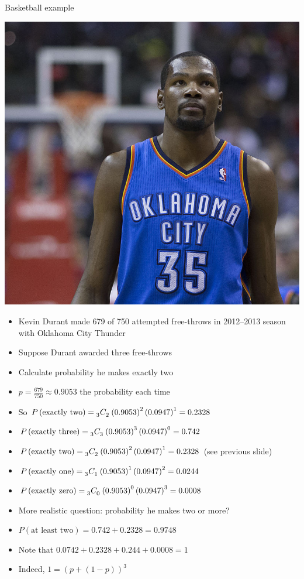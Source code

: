 \documentclass[handout,xcolor=dvipsnames]{beamer}
\theoremstyle{definition}
\newcommand\ncr[2]{\tensor[_{#1}]C{_{#2}}}
\begin{document}
\begin{frame}{Basketball example}
\begin{multicols}{2}
\includegraphics[scale=.75]{KevinDurant}
\begin{itemize}
\item Kevin Durant made 679 of 750 attempted free-throws
in 2012--2013 season with Oklahoma City Thunder
\item Suppose Durant awarded three free-throws
\item Calculate probability he makes exactly two
\item $p=\frac{679}{750}\approx 0.9053$ the probability
each time
\item So $P\left(\text{exactly two}\right)
=\ncr{3}{2}\left(0.9053\right)^2\left(0.0947\right)^1=0.2328$
\end{itemize}
\end{multicols}
\end{frame}

\begin{frame}
\begin{itemize}
\item $P\left(\text{exactly three}\right)
=\ncr{3}{3}\left(0.9053\right)^3\left(0.0947\right)^0=0.742$
\item $P\left(\text{exactly two}\right)
=\ncr{3}{2}\left(0.9053\right)^2\left(0.0947\right)^1=0.2328$
(see previous slide)
\item $P\left(\text{exactly one}\right)
=\ncr{3}{1}\left(0.9053\right)^1\left(0.0947\right)^2=0.0244$
\item $P\left(\text{exactly zero}\right)
=\ncr{3}{0}\left(0.9053\right)^0\left(0.0947\right)^3=0.0008$
\item More realistic question: probability he makes two or more?
\item $P\left(\text{at least two}\right)=0.742+0.2328=0.9748$
\item Note that $0.0742+0.2328+0.244+0.0008=1$
\item Indeed, $1=\left(p+\left(1-p\right)\right)^3$
\end{itemize}
\end{frame}
\end{document}
